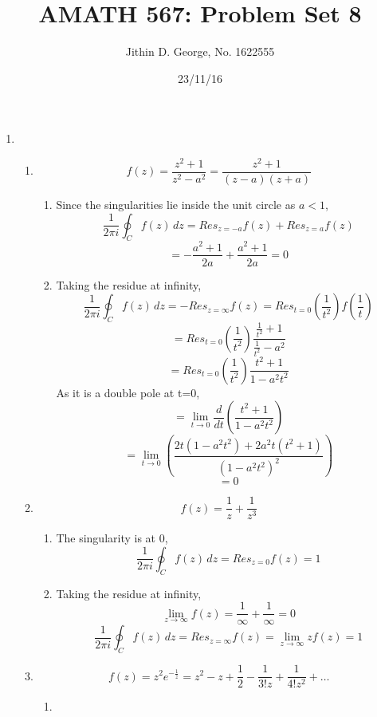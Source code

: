 \documentclass[a4paper]{article}
\title{AMATH 567: Problem Set 8}
\author{Jithin D. George, No. 1622555}
\date{23/11/16}
\begin{document}
\maketitle
\begin{enumerate}
	
	\item
	\begin{enumerate}

\item 

		\[ f(z) = \frac{z^2+1}{z^2-a^2}=\frac{z^2+1}{(z-a)(z+a)}\]
	\begin{enumerate}
		
		\item 
		

		Since the singularities lie inside the unit circle as $a <1$,
		\[\frac{1}{2\pi i}\oint_C f(z) \,dz= Res_{z=-a}f(z)+Res_{z=a}f(z)\]
		\[=-\frac{a^2+1}{2a}+\frac{a^2+1}{2a} =0\]
			\item
			
			Taking the residue at infinity,
			\[\frac{1}{2\pi i}\oint_C f(z) \,dz= -Res_{z=\infty}f(z)=Res_{t=0}(\frac{1}{t^2})f(\frac{1}{t})\]
		\[	=Res_{t=0} (\frac{1}{t^2})\frac{\frac{1}{t^2}+1}{\frac{1}{t^2}-a^2}\]	
		\[=Res_{t=0} (\frac{1}{t^2})\frac{t^2+1}{1-a^2t^2}\]
		As it is a double pole at t=0,	 
		\[=\lim_{t \to 0} \frac{d}{dt}\left(\frac{t^2+1}{1-a^2t^2}\right)\]
		\[=\lim_{t \to 0} \left(\frac{2t(1-a^2t^2)+2a^2t(t^2+1)}{(1-a^2t^2)^2}\right)\]
		\[=0\]
		
	
\end{enumerate} 
\item 
\[ f(z) = \frac{1}{z}+\frac{1}{z^3}\]
\begin{enumerate}
	
	\item 
	
	
	The singularity is at 0,
	\[\frac{1}{2\pi i}\oint_C f(z) \,dz= Res_{z=0}f(z)=1\]
	\item
	
	Taking the residue at infinity,
	\[\lim_{z\to\infty} f(z)= \frac{1}{\infty}+\frac{1}{\infty} =0 \]
	\[\frac{1}{2\pi i}\oint_C f(z) \,dz= Res_{z=\infty}f(z)= \lim_{z\to\infty} zf(z)= 1 \]
	
\end{enumerate}
\item 
\[ f(z) = z^2e^{-\frac{1}{z}} = z^2 -z+\frac{1}{2}-\frac{1}{3!z}+\frac{1}{4!z^2} + \ldots \]
\begin{enumerate}
	
	\item 
	

\end{enumerate}
\end{enumerate}
\end{enumerate}
\end{document}
